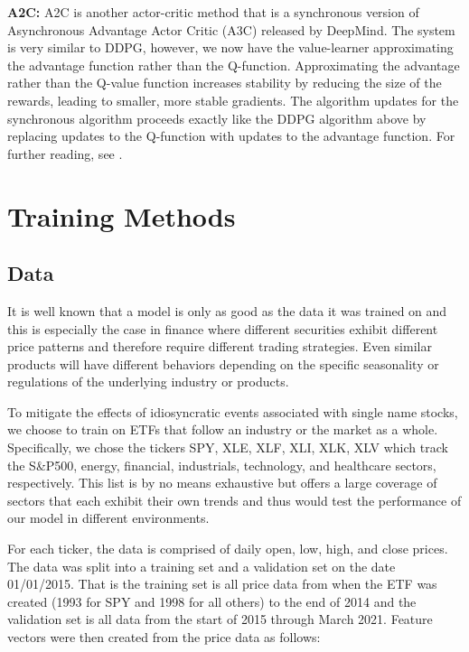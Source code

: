 \documentclass[12pt]{article}
\begin{document}
\textbf{A2C:} A2C is another actor-critic method that is a synchronous version of Asynchronous Advantage Actor Critic (A3C) released by DeepMind. The system is very similar to DDPG, however, we now have the value-learner approximating the advantage function rather than the Q-function. Approximating the advantage rather than the Q-value function increases stability by reducing the size of the rewards, leading to smaller, more stable gradients. The algorithm updates for the synchronous algorithm proceeds exactly like the DDPG algorithm above by replacing updates to the Q-function with updates to the advantage function. For further reading, see \cite{Mnih2016A2C}.

\section{Training Methods} \label{methods}

\subsection{Data}

It is well known that a model is only as good as the data it was trained on and this is especially the case in finance where different securities exhibit different price patterns and therefore require different trading strategies. Even similar products will have different behaviors depending on the specific seasonality or regulations of the underlying industry or products. 

To mitigate the effects of idiosyncratic events associated with single name stocks, we choose to train on ETFs that follow an industry or the market as a whole. Specifically, we chose the tickers SPY, XLE, XLF, XLI, XLK, XLV which track the S\&P500, energy, financial, industrials, technology, and healthcare sectors, respectively. This list is by no means exhaustive but offers a large coverage of sectors that each exhibit their own trends and thus would test the performance of our model in different environments.

For each ticker, the data is comprised of daily open, low, high, and close prices. The data was split into a training set and a validation set on the date 01/01/2015. That is the training set is all price data from when the ETF was created (1993 for SPY and 1998 for all others) to the end of 2014 and the validation set is all data from the start of 2015 through March 2021. Feature vectors were then created from the price data as follows:
\end{document}
